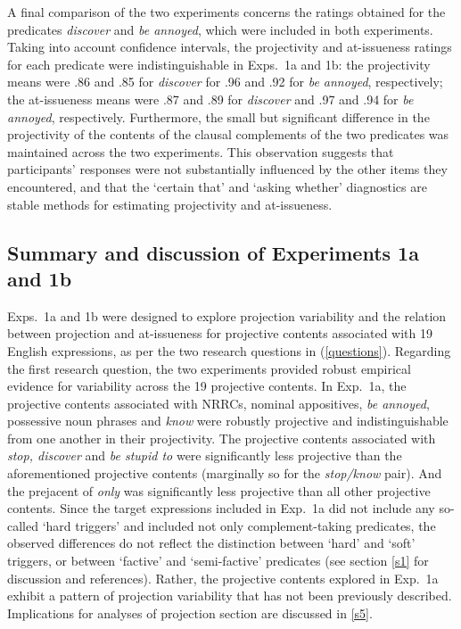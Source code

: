 \documentclass[11pt,fleqn]{article}
\newcommand{\6}{\mbox{$[\hspace*{-.6mm}[$}}
\newcommand{\9}{\mbox{$]\hspace*{-.6mm}]$}}
\begin{document}
A final comparison of the two experiments concerns the ratings obtained for the predicates {\em discover} and {\em be annoyed}, which were included in both experiments. Taking into account confidence intervals, the projectivity and at-issueness ratings for each predicate were indistinguishable in Exps.~1a and 1b: the projectivity means were .86 and .85 for {\em discover} for .96 and .92 for \emph{be annoyed}, respectively; the at-issueness means were .87 and .89 for \emph{discover} and .97 and .94 for \emph{be annoyed}, respectively. Furthermore, the small but significant difference in the projectivity of the contents of the clausal complements of the two predicates was maintained across the two experiments. This observation suggests that participants' responses were not substantially influenced by the other items they encountered, and that the `certain that' and `asking whether' diagnostics are stable methods for estimating projectivity and at-issueness.

\subsection{Summary and discussion of Experiments 1a and 1b}\label{s-summary1a1b}

Exps.~1a and 1b were designed to explore projection variability and the relation between projection and at-issueness for projective contents associated with 19 English expressions, as per the two research questions in (\ref{questions}). Regarding the first research question, the two experiments provided robust empirical evidence for variability across the 19 projective contents. In Exp.~1a, the projective contents associated with NRRCs, nominal appositives, {\em be annoyed}, possessive noun phrases and {\em know} were robustly projective and indistinguishable from one another in their projectivity. The projective contents associated with {\em stop, discover} and {\em be stupid to} were significantly less projective than the aforementioned projective contents (marginally so for the {\em stop/know} pair). And the prejacent of {\em only} was significantly less projective than all other projective contents. Since the target expressions included in Exp.~1a did not include any so-called `hard triggers' and included not only complement-taking predicates, the observed differences do not reflect the distinction between `hard' and `soft' triggers, or between `factive' and `semi-factive' predicates (see section \ref{s1} for discussion and references). Rather, the projective contents explored in Exp.~1a exhibit a pattern of projection variability that has not been previously described. Implications for analyses of projection section are discussed in \ref{s5}.
\end{document}
